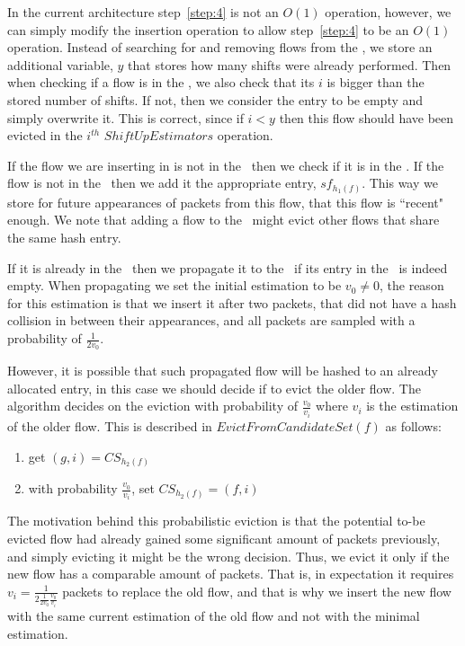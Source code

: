 In the current architecture step~\ref{step:4} is not an $O(1)$ operation, however, we can simply modify the insertion operation to allow step~\ref{step:4} to be an $O(1)$ operation. Instead of searching for and removing flows from the \cs, we store an additional variable, $y$ that stores how many shifts were already performed. Then when checking if a flow is in the \cs, we also check that its $i$ is bigger than the stored number of shifts. If not, then we consider the entry to be empty and simply overwrite it. This is correct, since if $i<y$ then this flow should have been evicted in the $i^{th}$ $ShiftUpEstimators$ operation.

If the flow we are inserting in is not in the \cs\ then we check if it is in the \sfa. If the flow is not in the \sfa\ then we add it the appropriate entry, $sf_{h_1(f)}$. This way we store for future appearances of packets from this flow, that this flow is ``recent" enough. We note that adding a flow to the \sfa\ might evict other flows that share the same hash entry.

If it is already in the \sfa\ then we propagate it to the \cs\ if its entry in the \cs\ is indeed empty. When propagating we set the initial estimation to be $v_0 \neq 0$, the reason for this estimation is that we insert it after two packets, that did not have a hash collision in between their appearances, and all packets are sampled with a probability of $\frac{1}{2v_0}$.

However, it is possible that such propagated flow will be hashed to an already allocated entry, in this case we should decide if to evict the older flow. The algorithm decides on the eviction with probability of $\frac{v_0}{v_i}$ where $v_i$ is the estimation of the older flow. This is described in $EvictFromCandidateSet(f)$ as follows:
\begin{enumerate}
  \item get $(g,i)=CS_{h_2(f)}$
  \item with probability $\frac{v_0}{v_i}$, set $CS_{h_2(f)}=(f,i)$
\end{enumerate}

The motivation behind this probabilistic eviction is that the potential to-be evicted flow had already gained some significant amount of packets previously, and simply evicting it might be the wrong decision. Thus, we evict it only if the new flow has a comparable amount of packets. That is, in expectation it requires $v_i = \frac{1}{ 2\frac{1}{2v_0}\frac{v_0}{v_i}}$ packets to replace the old flow, and that is why we insert the new flow with the same current estimation of the old flow and not with the minimal estimation.


